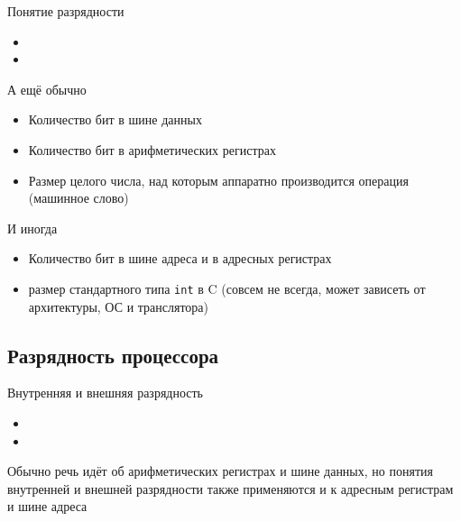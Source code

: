 \documentclass[xetex,aspectratio=43]{beamer}
\begin{document}
\begin{frame}{Понятие разрядности}

\begin{itemize}
    \item
    \item
\end{itemize}

\pause

\begin{block}{А ещё обычно}
    \begin{itemize}
        \tightlist
        \item
        Количество бит в шине данных
        \item
        Количество бит в арифметических регистрах
        \item
        Размер целого числа, над которым аппаратно производится операция
        (машинное слово)
    \end{itemize}
\end{block}

\pause

\begin{block}{И иногда}
    \begin{itemize}
        \tightlist
        \item
        Количество бит в шине адреса и в адресных регистрах
        \item размер стандартного типа
        \texttt{int} в C (совсем не всегда, может зависеть от архитектуры, ОС и транслятора)
    \end{itemize}
\end{block}

\end{frame}

\subsection{Разрядность процессора}

\begin{frame}{Внутренняя и внешняя разрядность}
\begin{itemize}
    \item
    \item
\end{itemize}

Обычно речь идёт об арифметических регистрах и шине данных, но понятия внутренней и внешней разрядности также применяются и к адресным регистрам и шине адреса

\end{frame}
\end{document}
